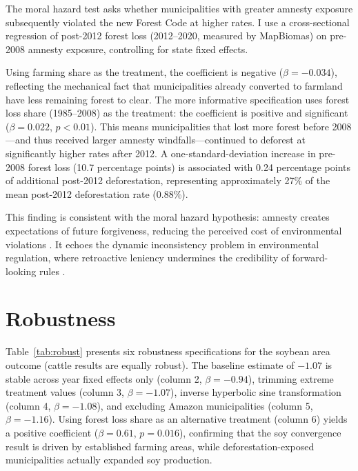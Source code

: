 \documentclass[12pt]{article}
\begin{document}
The moral hazard test asks whether municipalities with greater amnesty exposure subsequently violated the new Forest Code at higher rates. I use a cross-sectional regression of post-2012 forest loss (2012--2020, measured by MapBiomas) on pre-2008 amnesty exposure, controlling for state fixed effects.

Using farming share as the treatment, the coefficient is negative ($\beta = -0.034$), reflecting the mechanical fact that municipalities already converted to farmland have less remaining forest to clear. The more informative specification uses forest loss share (1985--2008) as the treatment: the coefficient is positive and significant ($\beta = 0.022$, $p < 0.01$). This means municipalities that lost more forest before 2008---and thus received larger amnesty windfalls---continued to deforest at significantly higher rates after 2012. A one-standard-deviation increase in pre-2008 forest loss (10.7 percentage points) is associated with 0.24 percentage points of additional post-2012 deforestation, representing approximately 27\% of the mean post-2012 deforestation rate (0.88\%).

This finding is consistent with the moral hazard hypothesis: amnesty creates expectations of future forgiveness, reducing the perceived cost of environmental violations \citep{pfaff2007big, assuncao2015deterring}. It echoes the dynamic inconsistency problem in environmental regulation, where retroactive leniency undermines the credibility of forward-looking rules \citep{koch2019slippery}.


\section{Robustness}



Table~\ref{tab:robust} presents six robustness specifications for the soybean area outcome (cattle results are equally robust). The baseline estimate of $-1.07$ is stable across year fixed effects only (column 2, $\beta = -0.94$), trimming extreme treatment values (column 3, $\beta = -1.07$), inverse hyperbolic sine transformation (column 4, $\beta = -1.08$), and excluding Amazon municipalities (column 5, $\beta = -1.16$). Using forest loss share as an alternative treatment (column 6) yields a positive coefficient ($\beta = 0.61$, $p = 0.016$), confirming that the soy convergence result is driven by established farming areas, while deforestation-exposed municipalities actually expanded soy production.
\end{document}
